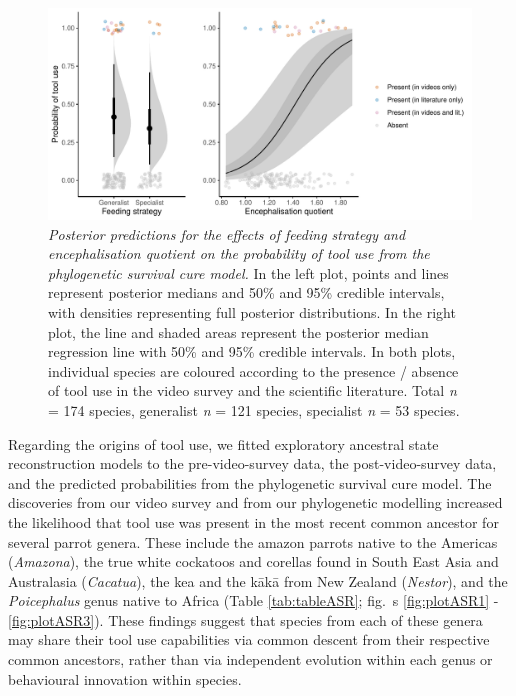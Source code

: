 \documentclass[
  man,floatsintext]{apa6}
\begin{document}
\begin{figure}
\centering
\includegraphics{manuscript_files/figure-latex/plotSurvCure4-1.pdf}
\caption{\label{fig:plotSurvCure4}\emph{Posterior predictions for the effects of feeding
strategy and encephalisation quotient on the probability of tool use from the
phylogenetic survival cure model.} In the left plot, points and lines represent
posterior medians and 50\% and 95\% credible intervals, with densities
representing full posterior distributions. In the right plot, the line and
shaded areas represent the posterior median regression line with 50\% and 95\%
credible intervals. In both plots, individual species are coloured according to
the presence / absence of tool use in the video survey and the scientific
literature. Total \emph{n} = 174 species, generalist \emph{n} =
121 species, specialist \emph{n} =
53 species.}
\end{figure}

Regarding the origins of tool use, we fitted exploratory ancestral state
reconstruction models to the pre-video-survey data, the post-video-survey data,
and the predicted probabilities from the phylogenetic survival cure model. The
discoveries from our video survey and from our phylogenetic modelling increased
the likelihood that tool use was present in the most recent common ancestor for
several parrot genera. These include the amazon parrots native to the Americas
(\emph{Amazona}), the true white cockatoos and corellas found in South East Asia and
Australasia (\emph{Cacatua}), the kea and the kākā from New Zealand (\emph{Nestor}), and
the \emph{Poicephalus} genus native to Africa (Table \ref{tab:tableASR};
fig.~s \ref{fig:plotASR1} - \ref{fig:plotASR3}). These findings
suggest that species from each of these genera may share their tool use
capabilities via common descent from their respective common ancestors, rather
than via independent evolution within each genus or behavioural innovation
within species.
\end{document}
